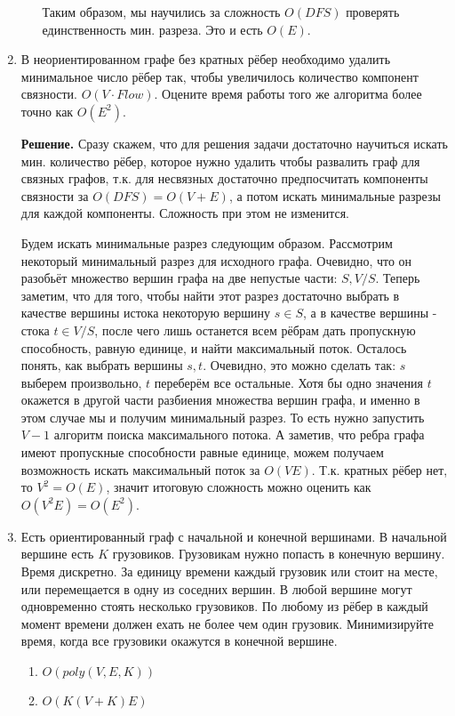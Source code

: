 \begin{enumerate}
\begin{enumerate}
		Таким образом, мы научились за сложность $O(DFS)$ проверять единственность мин. разреза. Это и есть 
		$O(E)$.
	\end{enumerate}
	
	\item В неориентированном графе без кратных рёбер необходимо удалить минимальное число рёбер так, чтобы 
	увеличилось количество компонент связности. $O(V \cdot Flow)$. Оцените время работы	того же алгоритма более 
	точно как $O(E^2)$.
	
	
	\textbf{Решение.} Сразу скажем, что для решения задачи достаточно научиться искать мин. количество рёбер, 
	которое нужно удалить чтобы развалить граф для связных графов, т.к. для несвязных достаточно предпосчитать 
	компоненты связности за $O(DFS) = O(V + E)$, а потом искать минимальные разрезы для каждой компоненты. 
	Сложность при этом не изменится.
	
	Будем искать минимальные разрез следующим образом. Рассмотрим некоторый минимальный разрез для исходного 
	графа. Очевидно, что он разобьёт множество вершин графа на две непустые части: $S, V / S$. Теперь заметим, 
	что для того, чтобы найти этот разрез достаточно выбрать в качестве вершины истока некоторую вершину $s \in 
	S$, а в качестве вершины - стока $t \in V / S$, после чего лишь останется всем рёбрам дать пропускную 
	способность, равную единице, и найти максимальный поток. Осталось понять, как выбрать вершины $s, t$. 
	Очевидно, это можно сделать так: $s$ выберем произвольно, $t$ переберём все остальные. Хотя бы одно значения 
	$t$ окажется в другой части разбиения множества вершин графа, и именно в этом случае мы и получим минимальный 
	разрез. То есть нужно запустить $V - 1$ алгоритм поиска максимального потока. А заметив, что ребра графа 
	имеют пропускные способности равные единице, можем получаем возможность искать максимальный поток за $O(VE)$. 
	Т.к. кратных рёбер нет, то $V^2 = O(E)$, значит итоговую сложность можно оценить как $O(V^2E) = O(E^2)$. 
	
	\item Есть ориентированный граф с начальной и конечной вершинами. В начальной вершине есть $K$ грузовиков. 
	Грузовикам нужно попасть в конечную вершину. Время дискретно. За единицу времени каждый грузовик или стоит на 
	месте, или перемещается в одну из соседних вершин. В любой вершине могут одновременно стоять несколько 
	грузовиков. По любому из рёбер в каждый момент времени должен ехать не более чем один грузовик. Минимизируйте 
	время, когда все грузовики окажутся в конечной вершине.
	\begin{enumerate}
		\item $O(poly(V, E, K))$
		\item $O(K(V + K)E)$
	\end{enumerate}
	

\end{enumerate}

